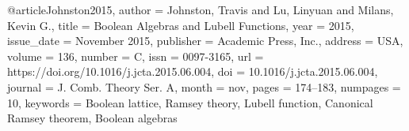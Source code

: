 @article{Johnston2015,
  author = {Johnston, Travis and Lu, Linyuan and Milans, Kevin G.},
  title = {Boolean Algebras and Lubell Functions},
  year = {2015},
  issue_date = {November 2015},
  publisher = {Academic Press, Inc.},
  address = {USA},
  volume = {136},
  number = {C},
  issn = {0097-3165},
  url = {https://doi.org/10.1016/j.jcta.2015.06.004},
  doi = {10.1016/j.jcta.2015.06.004},
  journal = {J. Comb. Theory Ser. A},
  month = nov,
  pages = {174–183},
  numpages = {10},
  keywords = {Boolean lattice, Ramsey theory, Lubell function, Canonical Ramsey theorem, Boolean algebras}
}
